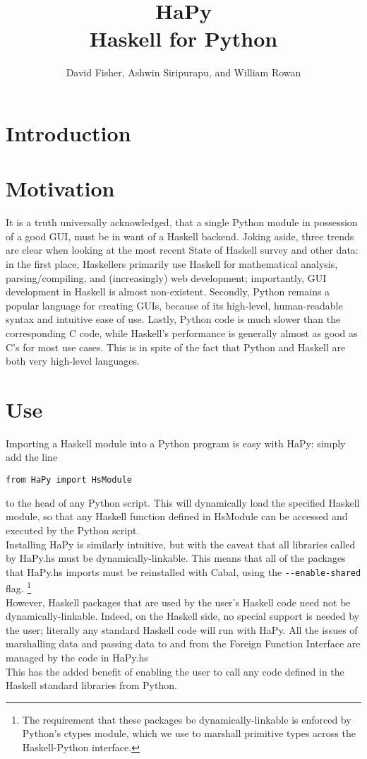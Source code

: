 \documentclass[11pt, letterpaper, oneside, twocolumn] {article}
\begin{document}
\title{HaPy \\
Haskell for Python
}
\author{David Fisher, Ashwin Siripurapu, and William Rowan}
\maketitle

\section{Introduction}

\section{Motivation}
It is a truth universally acknowledged, that a single Python module in possession of a good GUI, must be in want of a Haskell backend. Joking aside, three trends are clear when looking at the most recent State of Haskell survey and other data: in the first place, Haskellers primarily use Haskell for mathematical analysis, parsing/compiling, and (increasingly) web development; importantly, GUI development in Haskell is almost non-existent. Secondly, Python remains a popular language for creating GUIs, because of its high-level, human-readable syntax and intuitive ease of use. Lastly, Python code is much slower than the corresponding C code, while Haskell's performance is generally almost as good as C's for most use cases. This is in spite of the fact that Python and Haskell are both very high-level languages. 

\section{Use}
Importing a Haskell module into a Python program is easy with HaPy: simply add the line
\begin{verbatim}
from HaPy import HsModule
\end{verbatim}
to the head of any Python script. This will dynamically load the specified Haskell module, so that any Haskell function defined in HsModule can be accessed and executed by the Python script. \\
Installing HaPy is similarly intuitive, but with the caveat that all libraries called by HaPy.hs must be dynamically-linkable. This means that all of the packages that HaPy.hs imports must be reinstalled with Cabal, using the \verb!--enable-shared! flag. \footnote{The requirement that these packages be dynamically-linkable is enforced by Python's ctypes module, which we use to marshall primitive types across the Haskell-Python interface.} \\
However, Haskell packages that are used by the user's Haskell code need not be dynamically-linkable. Indeed, on the Haskell side, no special support is needed by the user; literally any standard Haskell code will run with HaPy. All the issues of marshalling data and passing data to and from the Foreign Function Interface are managed by the code in HaPy.hs \\
This has the added benefit of enabling the user to call any code defined in the Haskell standard libraries from Python. 
\end{document}
